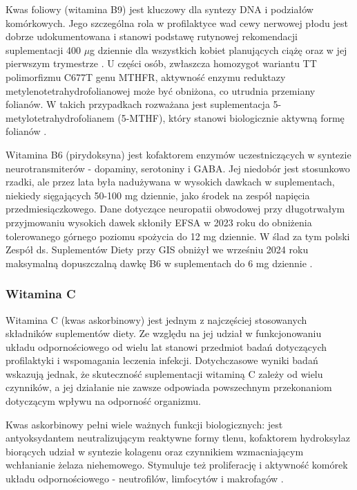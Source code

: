 Kwas foliowy (witamina B9) jest kluczowy dla syntezy DNA i podziałów komórkowych. Jego szczególna rola w profilaktyce wad cewy nerwowej płodu jest dobrze udokumentowana i stanowi podstawę rutynowej rekomendacji suplementacji 400 $\mu$g dziennie dla wszystkich kobiet planujących ciążę oraz w jej pierwszym trymestrze \cite{jarosz2020normy}. U części osób, zwłaszcza homozygot wariantu TT polimorfizmu C677T genu MTHFR, aktywność enzymu reduktazy metylenotetrahydrofolianowej może być obniżona, co utrudnia przemiany folianów. W takich przypadkach rozważana jest suplementacja 5-metylotetrahydrofolianem (5-MTHF), który stanowi biologicznie aktywną formę folianów \cite{jarosz2020normy}.

Witamina B6 (pirydoksyna) jest kofaktorem enzymów uczestniczących w syntezie neurotransmiterów - dopaminy, serotoniny i GABA. Jej niedobór jest stosunkowo rzadki, ale przez lata była nadużywana w wysokich dawkach w suplementach, niekiedy sięgających 50-100 mg dziennie, jako środek na zespół napięcia przedmiesiączkowego. Dane dotyczące neuropatii obwodowej przy długotrwałym przyjmowaniu wysokich dawek skłoniły EFSA w 2023 roku do obniżenia tolerowanego górnego poziomu spożycia do 12 mg dziennie. W ślad za tym polski Zespół ds. Suplementów Diety przy GIS obniżył we wrześniu 2024 roku maksymalną dopuszczalną dawkę B6 w suplementach do 6 mg dziennie \cite{uchwała-2-2024}.


\subsubsection{Witamina C}

Witamina C (kwas askorbinowy) jest jednym z najczęściej stosowanych składników suplementów diety. Ze względu na jej udział w funkcjonowaniu układu odpornościowego od wielu lat stanowi przedmiot badań dotyczących profilaktyki i wspomagania leczenia infekcji. Dotychczasowe wyniki badań wskazują jednak, że skuteczność suplementacji witaminą C zależy od wielu czynników, a jej działanie nie zawsze odpowiada powszechnym przekonaniom dotyczącym wpływu na odporność organizmu.

Kwas askorbinowy pełni wiele ważnych funkcji biologicznych: jest antyoksydantem neutralizującym reaktywne formy tlenu, kofaktorem hydroksylaz biorących udział w syntezie kolagenu oraz czynnikiem wzmacniającym wchłanianie żelaza niehemowego. Stymuluje też proliferację i aktywność komórek układu odpornościowego - neutrofilów, limfocytów i makrofagów \cite{hemila1996vitamin}.

